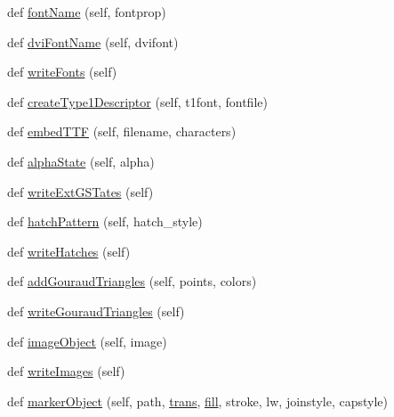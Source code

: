 \begin{DoxyCompactItemize}
\item 
def \hyperlink{classmatplotlib_1_1backends_1_1backend__pdf_1_1PdfFile_a677d60871daa65c04e9ff6aacf7865a0}{font\+Name} (self, fontprop)
\item 
def \hyperlink{classmatplotlib_1_1backends_1_1backend__pdf_1_1PdfFile_a662a6a1e1a4edd537fde7f4dc3c5eed8}{dvi\+Font\+Name} (self, dvifont)
\item 
def \hyperlink{classmatplotlib_1_1backends_1_1backend__pdf_1_1PdfFile_a4aa3c50359c96a3839b1a2b072e19f8a}{write\+Fonts} (self)
\item 
def \hyperlink{classmatplotlib_1_1backends_1_1backend__pdf_1_1PdfFile_ab6ef588f9860480d6caa944eee190159}{create\+Type1\+Descriptor} (self, t1font, fontfile)
\item 
def \hyperlink{classmatplotlib_1_1backends_1_1backend__pdf_1_1PdfFile_aa03c794d9eedf2de3e70582044085822}{embed\+T\+TF} (self, filename, characters)
\item 
def \hyperlink{classmatplotlib_1_1backends_1_1backend__pdf_1_1PdfFile_a4dfc3c22fb7326825ef91690cd3bff07}{alpha\+State} (self, alpha)
\item 
def \hyperlink{classmatplotlib_1_1backends_1_1backend__pdf_1_1PdfFile_a785bf48b97538e2a62485792fbee0486}{write\+Ext\+G\+S\+Tates} (self)
\item 
def \hyperlink{classmatplotlib_1_1backends_1_1backend__pdf_1_1PdfFile_aaa7872b551ad8e9a3f9b823ffd9ffd3d}{hatch\+Pattern} (self, hatch\+\_\+style)
\item 
def \hyperlink{classmatplotlib_1_1backends_1_1backend__pdf_1_1PdfFile_a1a4b3edc1402fb2ac4609c50383c8400}{write\+Hatches} (self)
\item 
def \hyperlink{classmatplotlib_1_1backends_1_1backend__pdf_1_1PdfFile_a0e4ee768db58561337c0511c3dda0e3c}{add\+Gouraud\+Triangles} (self, points, colors)
\item 
def \hyperlink{classmatplotlib_1_1backends_1_1backend__pdf_1_1PdfFile_ae66f7f2e92f02976906c36840b86226c}{write\+Gouraud\+Triangles} (self)
\item 
def \hyperlink{classmatplotlib_1_1backends_1_1backend__pdf_1_1PdfFile_a3e8bd1b98fe73ba9bda9608b45d014e7}{image\+Object} (self, image)
\item 
def \hyperlink{classmatplotlib_1_1backends_1_1backend__pdf_1_1PdfFile_ae93ccd4bfe05c63c1796227a40a5a9ae}{write\+Images} (self)
\item 
def \hyperlink{classmatplotlib_1_1backends_1_1backend__pdf_1_1PdfFile_aff3dee33fd6078f22d0d2e601f06c124}{marker\+Object} (self, path, \hyperlink{size_2foo_8f90_afabfd8da71309850231a00e53c61f106}{trans}, \hyperlink{namespacematplotlib_1_1backends_1_1backend__pdf_a621a4549ad3b8bd5c759541aa1739fa4}{fill}, stroke, lw, joinstyle, capstyle)

\end{DoxyCompactItemize}

